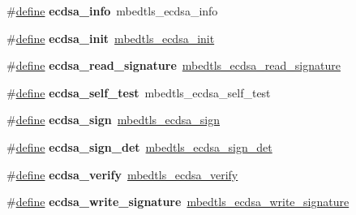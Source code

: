 \begin{DoxyCompactItemize}
\item 
\mbox{\label{compat-1_83_8h_a28765158c27ec9f41e541bbfe78205b3}} 
\#\hyperlink{structdefine}{define} {\bfseries ecdsa\+\_\+info}~mbedtls\+\_\+ecdsa\+\_\+info
\item 
\mbox{\label{compat-1_83_8h_ab0a085cafe4bac982e30d0749c411a65}} 
\#\hyperlink{structdefine}{define} {\bfseries ecdsa\+\_\+init}~\hyperlink{ecdsa_8h_aca644ee02921388fdc42eb06377f4b62}{mbedtls\+\_\+ecdsa\+\_\+init}
\item 
\mbox{\label{compat-1_83_8h_ab28c1304ef0d5cc4303d8e7d6d1d302e}} 
\#\hyperlink{structdefine}{define} {\bfseries ecdsa\+\_\+read\+\_\+signature}~\hyperlink{ecdsa_8h_a8085ade3e127118aa615f65cb1d393d5}{mbedtls\+\_\+ecdsa\+\_\+read\+\_\+signature}
\item 
\mbox{\label{compat-1_83_8h_afef389c9905c068cd77d49d0e855df24}} 
\#\hyperlink{structdefine}{define} {\bfseries ecdsa\+\_\+self\+\_\+test}~mbedtls\+\_\+ecdsa\+\_\+self\+\_\+test
\item 
\mbox{\label{compat-1_83_8h_a2508bc01c2a2e13f390ba1deabd85ae2}} 
\#\hyperlink{structdefine}{define} {\bfseries ecdsa\+\_\+sign}~\hyperlink{ecdsa_8h_af10f6fda2169862871d0ac07555c8641}{mbedtls\+\_\+ecdsa\+\_\+sign}
\item 
\mbox{\label{compat-1_83_8h_ab9b7415204b91fa0d02b87704618a432}} 
\#\hyperlink{structdefine}{define} {\bfseries ecdsa\+\_\+sign\+\_\+det}~\hyperlink{ecdsa_8h_a381af8cc9ab0146a4cf1ba5226c81a8f}{mbedtls\+\_\+ecdsa\+\_\+sign\+\_\+det}
\item 
\mbox{\label{compat-1_83_8h_a70b126590644788256d79a0843ad932f}} 
\#\hyperlink{structdefine}{define} {\bfseries ecdsa\+\_\+verify}~\hyperlink{ecdsa_8h_a2292032f359fda59a7fd14911cc56f38}{mbedtls\+\_\+ecdsa\+\_\+verify}
\item 
\mbox{\label{compat-1_83_8h_a80e53adf840b815aa3745b6311747254}} 
\#\hyperlink{structdefine}{define} {\bfseries ecdsa\+\_\+write\+\_\+signature}~\hyperlink{ecdsa_8h_a76da70289de1f746ad9cce1eadf7b135}{mbedtls\+\_\+ecdsa\+\_\+write\+\_\+signature}
\item 

\end{DoxyCompactItemize}
